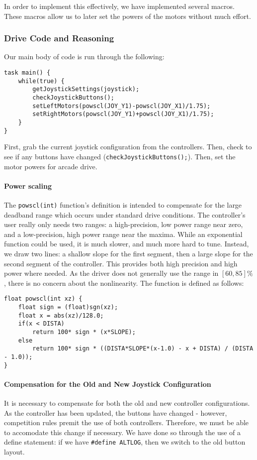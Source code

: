 \documentclass{article}
\begin{document}
In order to implement this effectively, we have implemented several macros. These macros allow us to later set the powers of the motors without much effort. 

\subsubsection{Drive Code and Reasoning}

Our main body of code is run through the following:

\begin{lstlisting}
task main() {
	while(true) {
		getJoystickSettings(joystick);
		checkJoystickButtons();
		setLeftMotors(powscl(JOY_Y1)-powscl(JOY_X1)/1.75);
		setRightMotors(powscl(JOY_Y1)+powscl(JOY_X1)/1.75);
	}
}
\end{lstlisting}

First, grab the current joystick configuration from the controllers. Then, check to see if any buttons have changed (\lstinline{checkJoystickButtons();}{}). Then, set the motor powers for arcade drive. 

\paragraph{Power scaling} The \lstinline{powscl(int)}{} function's definition is intended to compensate for the large deadband range which occurs under standard drive conditions. The controller's user really only needs two ranges: a high-precision, low power range near zero, and a low-precision, high power range near the maxima. While an exponential function could be used, it is much slower, and much more hard to tune. Instead, we draw two lines: a shallow slope for the first segment, then a large slope for the second segment of the controller. This provides both high precision and high power where needed. As the driver does not generally use the range in $[60,85]\%$, there is no concern about the nonlinearity. The function is defined as follows:

\begin{lstlisting}
float powscl(int xz) {
	float sign = (float)sgn(xz);
	float x = abs(xz)/128.0;
	if(x < DISTA)
		return 100* sign * (x*SLOPE);
	else
		return 100* sign * ((DISTA*SLOPE*(x-1.0) - x + DISTA) / (DISTA - 1.0));
}
\end{lstlisting}

\paragraph{Compensation for the Old and New Joystick Configuration} It is necessary to compensate for both the old and new controller configurations. As the controller has been updated, the buttons have changed - however, competition rules premit the use of both controllers. Therefore, we must be able to accomodate this change if necessary. We have done so through the use of a define statement: if we have \lstinline{#define ALTLOG}{}, then we switch to the old button layout.
\end{document}
